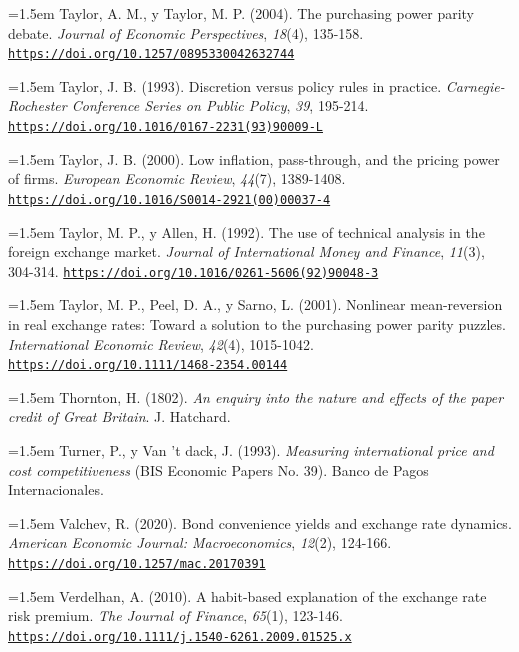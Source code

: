\documentclass[10pt,a4paper]{article}
\begin{document}
\noindent\hangindent=1.5em Taylor, A. M., y Taylor, M. P. (2004). The purchasing power parity debate. \textit{Journal of Economic Perspectives}, \textit{18}(4), 135-158. \href{https://doi.org/10.1257/0895330042632744}{\nolinkurl{https://doi.org/10.1257/0895330042632744}}

\noindent\hangindent=1.5em Taylor, J. B. (1993). Discretion versus policy rules in practice. \textit{Carnegie-Rochester Conference Series on Public Policy}, \textit{39}, 195-214. \href{https://doi.org/10.1016/0167-2231(93)90009-L}{\nolinkurl{https://doi.org/10.1016/0167-2231(93)90009-L}}

\noindent\hangindent=1.5em Taylor, J. B. (2000). Low inflation, pass-through, and the pricing power of firms. \textit{European Economic Review}, \textit{44}(7), 1389-1408. \href{https://doi.org/10.1016/S0014-2921(00)00037-4}{\nolinkurl{https://doi.org/10.1016/S0014-2921(00)00037-4}}

\noindent\hangindent=1.5em Taylor, M. P., y Allen, H. (1992). The use of technical analysis in the foreign exchange market. \textit{Journal of International Money and Finance}, \textit{11}(3), 304-314. \href{https://doi.org/10.1016/0261-5606(92)90048-3}{\nolinkurl{https://doi.org/10.1016/0261-5606(92)90048-3}}

\noindent\hangindent=1.5em Taylor, M. P., Peel, D. A., y Sarno, L. (2001). Nonlinear mean-reversion in real exchange rates: Toward a solution to the purchasing power parity puzzles. \textit{International Economic Review}, \textit{42}(4), 1015-1042. \href{https://doi.org/10.1111/1468-2354.00144}{\nolinkurl{https://doi.org/10.1111/1468-2354.00144}}

\noindent\hangindent=1.5em Thornton, H. (1802). \textit{An enquiry into the nature and effects of the paper credit of Great Britain}. J. Hatchard.

\noindent\hangindent=1.5em Turner, P., y Van 't dack, J. (1993). \textit{Measuring international price and cost competitiveness} (BIS Economic Papers No. 39). Banco de Pagos Internacionales.

\noindent\hangindent=1.5em Valchev, R. (2020). Bond convenience yields and exchange rate dynamics. \textit{American Economic Journal: Macroeconomics}, \textit{12}(2), 124-166. \href{https://doi.org/10.1257/mac.20170391}{\nolinkurl{https://doi.org/10.1257/mac.20170391}}

\noindent\hangindent=1.5em Verdelhan, A. (2010). A habit-based explanation of the exchange rate risk premium. \textit{The Journal of Finance}, \textit{65}(1), 123-146. \href{https://doi.org/10.1111/j.1540-6261.2009.01525.x}{\nolinkurl{https://doi.org/10.1111/j.1540-6261.2009.01525.x}}
\end{document}
